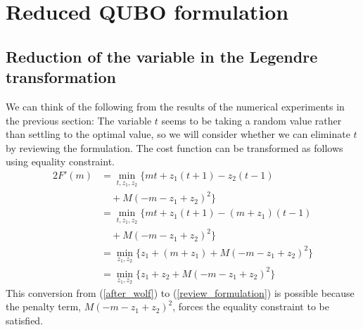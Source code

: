 \documentclass[fp,twocolumn]{jpsj3}
\begin{document}
\section{Reduced QUBO formulation} %
\subsection{Reduction of the variable in the Legendre transformation}
We can think of the following from the results of the numerical experiments in the previous section: The variable $t$ seems to be taking a random value rather than settling to the optimal value, so we will consider whether we can eliminate $t$ by reviewing the formulation. 
The cost function can be transformed as follows using equality constraint.
\begin{alignat}{2}
  F'(m)&=\min_{t,z_{1},z_{2}}{\{mt+z_{1}(t+1)-z_{2}(t-1)} \nonumber \\
  &\quad+M(-m-z_{1}+z_{2})^{2}\} \nonumber \\
  &=\min_{t,z_{1},z_{2}}{\{mt+z_{1}(t+1)-(m+z_{1})(t-1)} \nonumber \\
  &\quad+M(-m-z_{1}+z_{2})^{2}\} \nonumber \\
  &=\min_{z_{1},z_{2}}{\{z_{1}+(m+z_{1})+M(-m-z_{1}+z_{2})^{2}\}} \nonumber \\
  &=\min_{z_{1},z_{2}}{\{z_{1}+z_{2}+M(-m-z_{1}+z_{2})^{2}\}} \label{review_formulation}
\end{alignat}
This conversion from (\ref{after_wolf}) to (\ref{review_formulation}) is possible because the penalty term, $M(-m-z_{1}+z_{2})^{2}$, forces the equality constraint to be satisfied.
\end{document}

